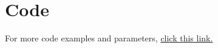 \documentclass{article}
\begin{document}
\section{Code}



\vspace{5mm}
For more code examples and parameters, \href{https://www.overleaf.com/learn/latex/Code_listing}{click this link.}
\end{document}
